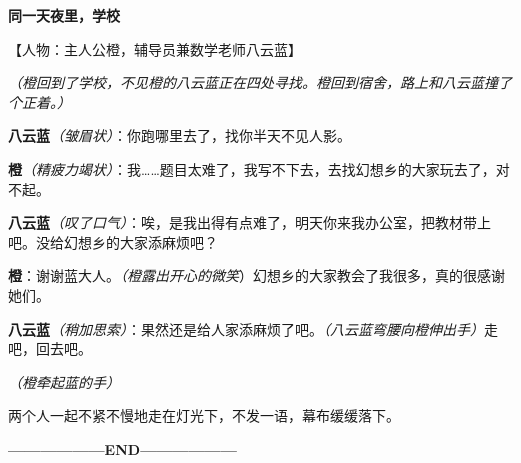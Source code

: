 \begin{multicols}{2}
     {\large \bfseries 同一天夜里，学校}\bigskip

    【人物：主人公橙，辅导员兼数学老师八云蓝】

    \textit{（橙回到了学校，不见橙的八云蓝正在四处寻找。橙回到宿舍，路上和八云蓝撞了个正着。）}

    \textbf{八云蓝}\textit{（皱眉状）}：你跑哪里去了，找你半天不见人影。

    \textbf{橙}\textit{（精疲力竭状）}：我……题目太难了，我写不下去，去找幻想乡的大家玩去了，对不起。

    \textbf{八云蓝}\textit{（叹了口气）}：唉，是我出得有点难了，明天你来我办公室，把教材带上吧。没给幻想乡的大家添麻烦吧？

    \textbf{橙}：谢谢蓝大人。\textit{（橙露出开心的微笑}）幻想乡的大家教会了我很多，真的很感谢她们。

    \textbf{八云蓝}\textit{（稍加思索）}：果然还是给人家添麻烦了吧。\textit{（八云蓝弯腰向橙伸出手）}走吧，回去吧。

    \textit{（橙牵起蓝的手）}

    两个人一起不紧不慢地走在灯光下，不发一语，幕布缓缓落下。

\end{multicols}

\begin{center}
    \bfseries ——————END——————
\end{center}


